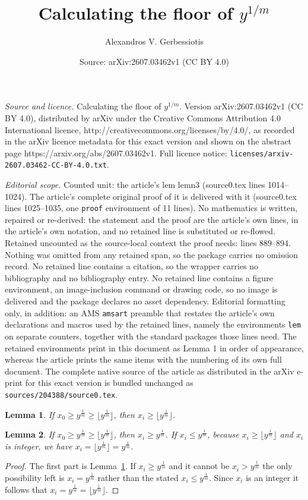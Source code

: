 \documentclass[10pt,a4paper]{amsart}
\title{Calculating the floor of $y^{1/m}$}
\author{Alexandros V. Gerbessiotis}
\date{Source: arXiv:2607.03462v1 (CC BY 4.0)}
\newtheorem{lem}{Lemma}
\newcommand{\floor}[1]{\lfloor #1 \rfloor}
\begin{document}
\maketitle

\noindent\emph{Source and licence.} Calculating the floor of $y^{1/m}$. Version arXiv:2607.03462v1 (CC BY 4.0), distributed by arXiv under the Creative Commons Attribution 4.0 International licence, http://creativecommons.org/licenses/by/4.0/, as recorded in the arXiv licence metadata for this exact version and shown on the abstract page https://arxiv.org/abs/2607.03462v1. Full licence notice: \texttt{licenses/arxiv-2607.03462-CC-BY-4.0.txt}.\par\smallskip

\noindent\textit{Editorial scope.} Counted unit: the article's lem lemn3 (source0.tex lines 1014--1024). The article's complete original proof of it is delivered with it (source0.tex lines 1025--1035, one \texttt{proof} environment of 11 lines). No mathematics is written, repaired or re-derived: the statement and the proof are the article's own lines, in the article's own notation, and no retained line is substituted or re-flowed.  Retained uncounted as the source-local context the proof needs: lines 889--894.  Nothing was omitted from any retained span, so the package carries no omission record.  No retained line contains a citation, so the wrapper carries no bibliography and no bibliography entry.  No retained line contains a figure environment, an image-inclusion command or drawing code, so no image is delivered and the package declares no asset dependency.  Editorial formatting only, in addition: an AMS \texttt{amsart} preamble that restates the article's own declarations and macros used by the retained lines, namely the environments \texttt{lem} on separate counters, together with the standard packages those lines need.  The retained environments print in this document as Lemma 1 in order of appearance, whereas the article prints the same items with the numbering of its own full document.  The complete native source of the article as distributed in the arXiv e-print for this exact version is bundled unchanged as \texttt{sources/204388/source0.tex}.
\begin{lem}
\label{lemn1}
If $x_0 \geq y^{\frac{1}{m}} \geq
\floor{ y^{\frac{1}{m}} }$,
then $x_i \geq \floor{ y^{\frac{1}{m}} }$.
\end{lem}

\begin{lem}
\label{lemn3}
If $x_0 \geq y^{\frac{1}{m}} \geq
\floor{ y^{\frac{1}{m}} }$,
then $x_i  \geq  y^{\frac{1}{m}} $.
If $x_i \leq y^{\frac{1}{m}}$, 
because
$x_i \geq \floor{ y^{\frac{1}{m}} }$ and $x_i$ is
integer,
we have $x_i = \floor{ y^{\frac{1}{m}} } = y^{\frac{1}{m}}$.
\end{lem}

\begin{proof}
The first part is Lemma~\ref{lemn1}.
If $x_i \geq  y^{\frac{1}{m}} $ and it cannot be
 $x_i  >    y^{\frac{1}{m}} $ the only possibility
left is
 $x_i  =    y^{\frac{1}{m}} $ rather than the
stated
 $x_i  \leq y^{\frac{1}{m}} $.
Since $x_i$ is an integer it follows that
$x_i = y^{\frac{1}{m}} =\floor{y^{\frac{1}{m}}}$.
\end{proof}
\end{document}
